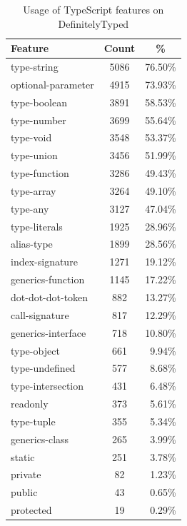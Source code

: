 \documentclass[sigconf]{acmart}
\begin{document}
\begin{table}[tp]
  \begin{center}
    \begin{tabular}{ |l|c|r| } 
      \hline
      \textbf{Feature} & \textbf{Count} & \multicolumn{1}{|c|}{\textbf{\%}} \\ 
      \hline
      type-string & 5086 & 76.50\% \\
      optional-parameter & 4915 & 73.93\% \\
      type-boolean & 3891 & 58.53\% \\
      type-number & 3699 & 55.64\% \\
      type-void & 3548 & 53.37\% \\
      type-union & 3456 & 51.99\% \\
      type-function & 3286 & 49.43\% \\
      type-array & 3264 & 49.10\% \\
      type-any & 3127 & 47.04\% \\
      type-literals & 1925 & 28.96\% \\
      alias-type & 1899 & 28.56\% \\
      index-signature & 1271 & 19.12\% \\
      generics-function & 1145 & 17.22\% \\
      dot-dot-dot-token & 882 & 13.27\% \\
      call-signature & 817 & 12.29\% \\
      generics-interface & 718 & 10.80\% \\
      type-object & 661 & 9.94\% \\
      type-undefined & 577 & 8.68\% \\
      type-intersection & 431 & 6.48\% \\
      readonly & 373 & 5.61\% \\
      type-tuple & 355 & 5.34\% \\
      generics-class & 265 & 3.99\% \\
      static & 251 & 3.78\% \\
      private & 82 & 1.23\% \\
      public & 43 & 0.65\% \\
      protected & 19 & 0.29\% \\
      \hline
    \end{tabular}
  \end{center}
  \caption{Usage of TypeScript features on DefinitelyTyped}
  \label{tab:dts-parse-stats}
\end{table}
\end{document}
